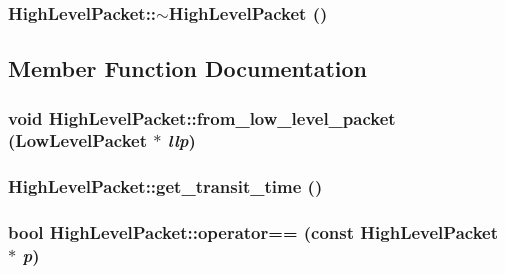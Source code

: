\hypertarget{classHighLevelPacket_dc29e5ebbbb6e7c3b1d1a53b0ea14142}{
\subsubsection[{$\sim$HighLevelPacket}]{\setlength{\rightskip}{0pt plus 5cm}HighLevelPacket::$\sim$HighLevelPacket ()}}
\label{classHighLevelPacket_dc29e5ebbbb6e7c3b1d1a53b0ea14142}




\subsection{Member Function Documentation}
\hypertarget{classHighLevelPacket_6a4e25020ea0c66aab015e9c2a2c8c85}{
\subsubsection[{from\_\-low\_\-level\_\-packet}]{\setlength{\rightskip}{0pt plus 5cm}void HighLevelPacket::from\_\-low\_\-level\_\-packet ({\bf LowLevelPacket} $\ast$ {\em llp})}}
\label{classHighLevelPacket_6a4e25020ea0c66aab015e9c2a2c8c85}


\hypertarget{classHighLevelPacket_0ddd2a5fd2195c2ce43198c82163522c}{
\subsubsection[{get\_\-transit\_\-time}]{ HighLevelPacket::get\_\-transit\_\-time ()}}
\label{classHighLevelPacket_0ddd2a5fd2195c2ce43198c82163522c}


\hypertarget{classHighLevelPacket_08e3560b71bab8b1ff31844d8ddff819}{
\subsubsection[{operator==}]{\setlength{\rightskip}{0pt plus 5cm}bool HighLevelPacket::operator== (const {\bf HighLevelPacket} $\ast$ {\em p})}}
\label{classHighLevelPacket_08e3560b71bab8b1ff31844d8ddff819}



